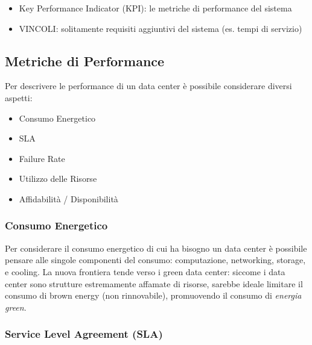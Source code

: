 \documentclass{article}
\providecommand{\tightlist}{%
		  \setlength{\itemsep}{0pt}\setlength{\parskip}{0pt}}
\begin{document}
		\begin{itemize}
		\tightlist
		\item
		  Key Performance Indicator (KPI): le metriche
		  di performance del sistema
		\item
		  VINCOLI: solitamente requisiti aggiuntivi del sistema (es.
		  tempi di servizio)
		\end{itemize}
		
		\hypertarget{metriche-di-performance}{%
		\subsection{Metriche di Performance}\label{metriche-di-performance}}
		Per descrivere le performance di un data center è possibile considerare
		diversi aspetti:
		
		\begin{itemize}
		\tightlist
		\item
		  Consumo Energetico
		\item
		  SLA
		\item
		  Failure Rate
		\item
		  Utilizzo delle Risorse
		\item
		  Affidabilità / Disponibilità
		\end{itemize}
		\subsubsection{Consumo Energetico}
		Per considerare il consumo energetico di cui ha bisogno un data center è
		possibile pensare alle singole componenti del consumo:
		computazione, networking, storage, e
		cooling. La nuova frontiera tende verso i green
		data center: siccome i data center sono strutture estremamente affamate
		di risorse, sarebbe ideale limitare il consumo di brown energy
		(non rinnovabile), promuovendo il consumo di \emph{energia
		green}.
		
		\subsubsection{Service Level Agreement (SLA)}\label{service-level-agreement-sla}
		
\end{document}
